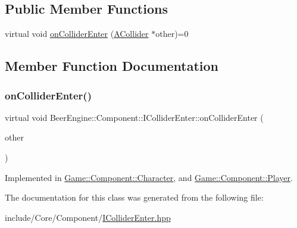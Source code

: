 \subsection*{Public Member Functions}
\begin{DoxyCompactItemize}
\item 
virtual void \mbox{\hyperlink{class_beer_engine_1_1_component_1_1_i_collider_enter_a2b1d3e4210b12de57f70368a8a9b6686}{on\+Collider\+Enter}} (\mbox{\hyperlink{class_beer_engine_1_1_component_1_1_a_collider}{A\+Collider}} $\ast$other)=0
\end{DoxyCompactItemize}


\subsection{Member Function Documentation}
\mbox{\label{class_beer_engine_1_1_component_1_1_i_collider_enter_a2b1d3e4210b12de57f70368a8a9b6686}} 
\subsubsection{\texorpdfstring{on\+Collider\+Enter()}{onColliderEnter()}}
{\footnotesize\ttfamily virtual void Beer\+Engine\+::\+Component\+::\+I\+Collider\+Enter\+::on\+Collider\+Enter (\begin{DoxyParamCaption}\item[{\mbox{\hyperlink{class_beer_engine_1_1_component_1_1_a_collider}{A\+Collider}} $\ast$}]{other }\end{DoxyParamCaption})\hspace{0.3cm}{\ttfamily [pure virtual]}}



Implemented in \mbox{\hyperlink{class_game_1_1_component_1_1_character_abf25f82178afa36cf7fcf148877fad24}{Game\+::\+Component\+::\+Character}}, and \mbox{\hyperlink{class_game_1_1_component_1_1_player_a68981bff23caf1fa65ea9a9007265b54}{Game\+::\+Component\+::\+Player}}.



The documentation for this class was generated from the following file\+:\begin{DoxyCompactItemize}
\item 
include/\+Core/\+Component/\mbox{\hyperlink{_i_collider_enter_8hpp}{I\+Collider\+Enter.\+hpp}}\end{DoxyCompactItemize}
